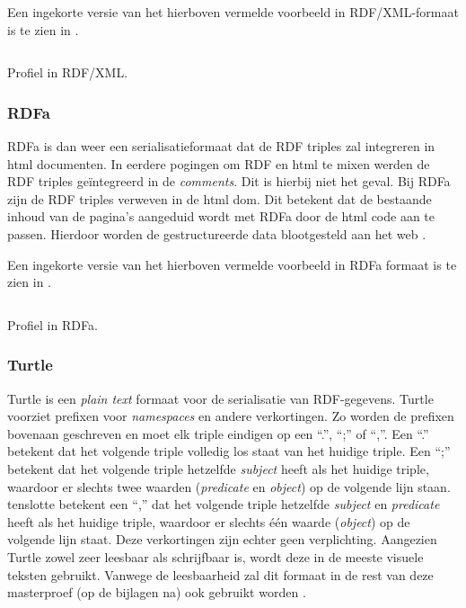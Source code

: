 Een ingekorte versie van het hierboven vermelde voorbeeld in RDF/XML-formaat is te zien in .

\begin{listing}[ht]
    \inputminted{xml}{data/profile_short.rdf}
    \caption{Profiel in RDF/XML.}
    \label{listing:profile_xml}
\end{listing}


\subsubsection{RDFa}
RDFa is dan weer een serialisatieformaat dat de RDF triples zal integreren in \acrfull{html} documenten. In eerdere pogingen om RDF en \acrshort{html} te mixen werden de RDF triples geïntegreerd in de \textit{comments}. Dit is hierbij niet het geval. Bij RDFa zijn de RDF triples verweven in de \acrshort{html} \acrfull{dom}. Dit betekent dat de bestaande inhoud van de pagina's aangeduid wordt met RDFa door de \acrshort{html} code aan te passen. Hierdoor worden de gestructureerde data blootgesteld aan het web \cite{adida2012rdfa}.

Een ingekorte versie van het hierboven vermelde voorbeeld in RDFa formaat is te zien in .

\begin{listing}[ht]
    \inputminted{html}{data/profile_short.html}
    \caption{Profiel in RDFa.}
    \label{listing:profile_rdfa}
\end{listing}


\subsubsection{Turtle}
Turtle is een \textit{plain text} formaat voor de serialisatie van RDF-gegevens. Turtle voorziet prefixen voor \textit{namespaces} en andere verkortingen. Zo worden de prefixen bovenaan geschreven en moet elk triple eindigen op een ``.'', ``;'' of ``,''. Een ``.'' betekent dat het volgende triple volledig los staat van het huidige triple. Een ``;'' betekent dat het volgende triple hetzelfde \textit{subject} heeft als het huidige triple, waardoor er slechts twee waarden (\textit{predicate} en \textit{object}) op de volgende lijn staan. tenslotte betekent een ``,'' dat het volgende triple hetzelfde \textit{subject} en \textit{predicate} heeft als het huidige triple, waardoor er slechts één waarde (\textit{object}) op de volgende lijn staat. Deze verkortingen zijn echter geen verplichting. Aangezien Turtle zowel zeer leesbaar als schrijfbaar is, wordt deze in de meeste visuele teksten gebruikt. Vanwege de leesbaarheid zal dit formaat in de rest van deze masterproef (op de bijlagen na) ook gebruikt worden  \cite{beckett2014rdfturtle}.

